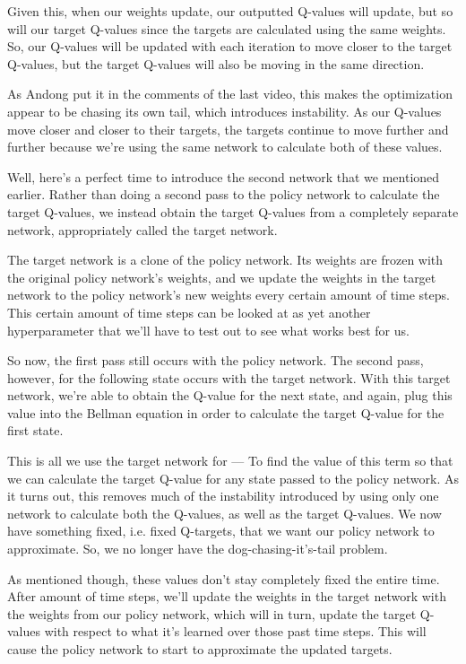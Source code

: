 			
			Given this, when our weights update, our outputted Q-values will update, but so will our target Q-values since the targets are calculated using the same weights. So, our Q-values will be updated with each iteration to move closer to the target Q-values, but the target Q-values will also be moving in the same direction.
			
			As Andong put it in the comments of the last video, this makes the optimization appear to be chasing its own tail, which introduces instability. As our Q-values move closer and closer to their targets, the targets continue to move further and further because we're using the same network to calculate both of these values.
			
			
			Well, here's a perfect time to introduce the second network that we mentioned earlier. Rather than doing a second pass to the policy network to calculate the target Q-values, we instead obtain the target Q-values from a completely separate network, appropriately called the target network.
			
			The target network is a clone of the policy network. Its weights are frozen with the original policy network’s weights, and we update the weights in the target network to the policy network’s new weights every certain amount of time steps. This certain amount of time steps can be looked at as yet another hyperparameter that we'll have to test out to see what works best for us.
			
			
			So now, the first pass still occurs with the policy network. The second pass, however, for the following state occurs with the target network. With this target network, we're able to obtain the  Q-value for the next state, and again, plug this value into the Bellman equation in order to calculate the target Q-value for the first state.
			
			
			This is all we use the target network for — To find the value of this  term so that we can calculate the target Q-value for any state passed to the policy network.
			As it turns out, this removes much of the instability introduced by using only one network to calculate both the Q-values, as well as the target Q-values. We now have something fixed, i.e. fixed Q-targets, that we want our policy network to approximate. So, we no longer have the dog-chasing-it's-tail problem.
			
			As mentioned though, these values don't stay completely fixed the entire time. After  amount of time steps, we'll update the weights in the target network with the weights from our policy network, which will in turn, update the target Q-values with respect to what it's learned over those past time steps. This will cause the policy network to start to approximate the updated targets.
		

